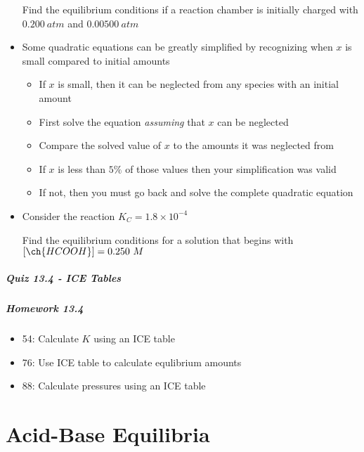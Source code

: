 \documentclass[12pt, openany, letterpaper]{memoir}
\begin{document}
\begin{itemize}
	Find the equilibrium conditions if a reaction chamber is initially charged with $0.200~atm$  and $0.00500~atm$ 
	\item Some quadratic equations can be greatly simplified by recognizing when $x$ is small compared to initial amounts
	\begin{itemize}
		\item If $x$ is small, then it can be neglected from any species with an initial amount
		\item First solve the equation \emph{assuming} that $x$ can be neglected
		\item Compare the solved value of $x$ to the amounts it was neglected from
		\item If $x$ is less than $5\%$ of those values then your simplification was valid
		\item If not, then you must go back and solve the complete quadratic equation
	\end{itemize}
	\item Consider the reaction  \hspace{1em} $K_C=1.8\times10^{-4}$
	
	Find the equilibrium conditions for a solution that begins with $\left[\ch{HCOOH}\right]=0.250~M$
\end{itemize}

\paragraph*{Quiz 13.4 - ICE Tables}
\paragraph*{Homework 13.4}
\begin{itemize}
  \item 54: Calculate $K$ using an ICE table
  \item 76: Use ICE table to calculate equlibrium amounts
  \item 88: Calculate pressures using an ICE table
\end{itemize}

\chapter{Acid-Base Equilibria}
\end{document}
